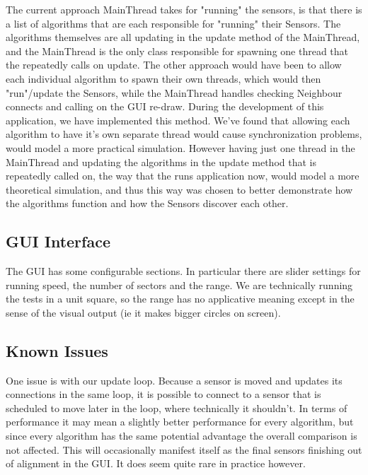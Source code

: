 The current approach MainThread takes for "running" the sensors, is that there is a list of algorithms that are each responsible for "running" their Sensors. The algorithms themselves are all updating in the update method of the MainThread, and the MainThread is the only class responsible for spawning one thread that the repeatedly calls on update. The other approach would have been to allow each individual algorithm to spawn their own threads, which would then "run"/update the Sensors, while the MainThread handles checking Neighbour connects and calling on the GUI re-draw. During the development of this application, we have implemented this method. We've found that allowing each algorithm to have it's own separate thread would cause synchronization problems, would model a more practical simulation. However having just one thread in the MainThread and updating the algorithms in the update method that is repeatedly called on, the way that the runs application now, would model a more theoretical simulation, and thus this way was chosen to better demonstrate how the algorithms function and how the Sensors discover each other.

\subsection{GUI Interface}
The GUI has some configurable sections. In particular there are slider settings for running speed, the number of sectors and the range. We are technically running the tests in a unit square, so the range has no applicative meaning except in the sense of the visual output (ie it makes bigger circles on screen).

\subsection{Known Issues}
One issue is with our update loop. Because a sensor is moved and updates its connections in the same loop, it is possible to connect to a sensor that is scheduled to move later in the loop, where technically it shouldn't. In terms of performance it may mean a slightly better performance for every algorithm, but since every algorithm has the same potential advantage the overall comparison is not affected. This will occasionally manifest itself as the final sensors finishing out of alignment in the GUI. It does seem quite rare in practice however.
 